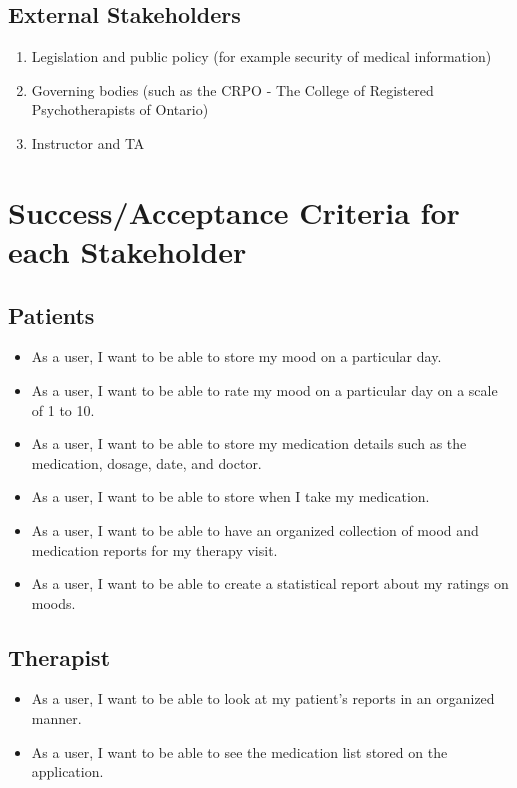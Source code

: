 \documentclass[11pt]{article}
\begin{document}
    \subsection{External Stakeholders}\label{subsec:external-stakeholders}
    \begin{enumerate}
        \item Legislation and public policy (for example security of medical information)
        \item Governing bodies (such as the CRPO - The College of Registered Psychotherapists of Ontario)
        \item Instructor and TA
    \end{enumerate}


    \section{Success/Acceptance Criteria for each Stakeholder}\label{sec:success/acceptance-criteria-for-each-stakeholder}

    \subsection{Patients}\label{subsec:patients}
    \begin{itemize}
        \item As a user, I want to be able to store my mood on a particular day.
        \item As a user, I want to be able to rate my mood on a particular day on a scale of 1 to 10.
        \item As a user, I want to be able to store my medication details such as the medication, dosage, date, and doctor.
        \item As a user, I want to be able to store when I take my medication.
        \item As a user, I want to be able to have an organized collection of mood and medication reports for my therapy visit.
        \item As a user, I want to be able to create a statistical report about my ratings on moods.

    \end{itemize}

    \subsection{Therapist}\label{subsec:therapist}
    \begin{itemize}
        \item As a user, I want to be able to look at my patient's reports in an organized manner.
        \item As a user, I want to be able to see the medication list stored on the application.

    \end{itemize}
\end{document}
